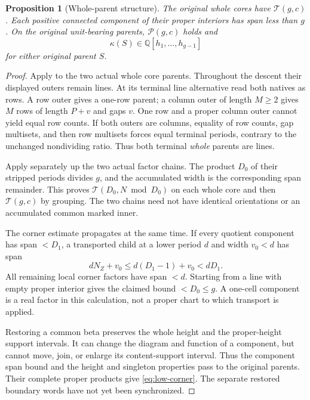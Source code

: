 \documentclass[11pt,a4paper]{amsart}
\numberwithin{equation}{section}
\theoremstyle{plain}
\newtheorem{proposition}[theorem]{Proposition}
\theoremstyle{definition}
\newcommand{\Q}{\mathbb Q}
\begin{document}
\begin{proposition}[Whole-parent structure]\label{prop:whole-structure}
The original whole cores have \(\mathcal T(g,c)\).  Each positive connected
component of their proper interiors has span less than \(g\).  On the
original unit-bearing parents, \(\mathcal P(g,c)\) holds and
\begin{equation}\label{eq:low-corner}
 \kappa(S)\in\Q[h_1,\ldots,h_{g-1}]
\end{equation}
for either original parent \(S\).
\end{proposition}
\begin{proof}
Apply  to the two actual whole core parents.
Throughout the descent their displayed outers remain lines.  At its
terminal line alternative read both natives as rows.  A row outer gives a
one-row parent; a column outer of length \(M\ge2\) gives \(M\) rows of length
\(P+v\) and gaps \(v\).  One row and a proper column outer cannot yield equal
row counts.  If both outers are columns, equality of row counts, gap
multisets, and then row multisets forces equal terminal periods, contrary
to the unchanged nondividing ratio.  Thus both terminal \emph{whole}
parents are lines.

Apply  separately up the two actual factor chains.
The product \(D_0\) of their stripped periods divides \(g\), and the accumulated
width is the corresponding span remainder.  This proves \(\mathcal T(D_0,N
\bmod D_0)\) on each whole core and then \(\mathcal T(g,c)\) by grouping.
The two chains need not have identical orientations or an accumulated
common marked inner.

The corner estimate propagates at the same time.  If every quotient
component has span \(<D_1\), a transported child at a lower period \(d\) and
width \(v_0<d\) has span
\[
 dN_Z+v_0\le d(D_1-1)+v_0<dD_1.
\]
All remaining local corner factors have span \(<d\).  Starting from a line
with empty proper interior gives the claimed bound \(<D_0\le g\).
A one-cell component is a real factor in this calculation, not a proper
chart to which transport is applied.

Restoring a common beta preserves the whole height and the proper-height
support intervals.  It can change the diagram and function of a component,
but cannot move, join, or enlarge its content-support interval.  Thus the
component span bound and the height and singleton properties pass to the
original parents.  Their complete proper products give \eqref{eq:low-corner}.
The separate restored boundary words have not yet been synchronized.
\end{proof}
\end{document}
